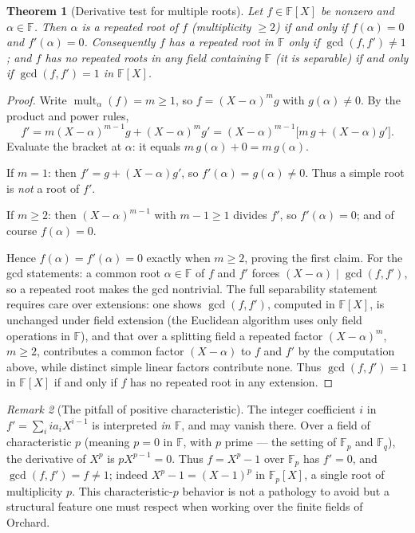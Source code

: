 \documentclass[11pt,a4paper]{article}
\newtheorem{theorem}{Theorem}[section]
\theoremstyle{definition}
\theoremstyle{remark}
\newtheorem{remark}[theorem]{Remark}
\newcommand{\F}{\ensuremath{\mathbb{F}}}
\newcommand{\Fp}{\ensuremath{\mathbb{F}_{p}}}
\newcommand{\Fq}{\ensuremath{\mathbb{F}_{q}}}
\begin{document}
\begin{theorem}[Derivative test for multiple roots]\label{polynomials:thm:multiple-root}
Let \(f \in \F[X]\) be nonzero and \(\alpha \in \F\). Then \(\alpha\) is a
repeated root of \(f\) (multiplicity \(\ge 2\)) if and only if
\(f(\alpha) = 0\) and \(f'(\alpha) = 0\). Consequently \(f\) has a repeated root
in \(\F\) only if \(\gcd(f, f') \neq 1\); and \(f\) has no repeated roots in any
field containing \(\F\) (it is \emph{separable}) if and only if
\(\gcd(f, f') = 1\) in \(\F[X]\).
\end{theorem}

\begin{proof}
Write \(\operatorname{mult}_\alpha(f) = m \ge 1\), so \(f = (X - \alpha)^m g\)
with \(g(\alpha) \neq 0\). By the product and power rules,
\[
  f' = m (X - \alpha)^{m-1} g + (X - \alpha)^m g'
     = (X - \alpha)^{m-1}\bigl[m\, g + (X - \alpha) g'\bigr].
\]
Evaluate the bracket at \(\alpha\): it equals \(m\, g(\alpha) + 0 = m\, g(\alpha)\).

If \(m = 1\): then \(f' = g + (X-\alpha)g'\), so \(f'(\alpha) = g(\alpha) \neq 0\).
Thus a simple root is \emph{not} a root of \(f'\).

If \(m \ge 2\): then \((X-\alpha)^{m-1}\) with \(m - 1 \ge 1\) divides \(f'\),
so \(f'(\alpha) = 0\); and of course \(f(\alpha) = 0\).

Hence \(f(\alpha) = f'(\alpha) = 0\) exactly when \(m \ge 2\), proving the first
claim. For the gcd statements: a common root \(\alpha \in \F\) of \(f\) and
\(f'\) forces \((X - \alpha) \mid \gcd(f, f')\), so a repeated root makes the gcd
nontrivial. The full separability statement requires care over extensions: one
shows \(\gcd(f, f')\), computed in \(\F[X]\), is unchanged under field extension
(the Euclidean algorithm uses only field operations in \(\F\)), and that over a
splitting field a repeated factor \((X-\alpha)^m\), \(m\ge 2\), contributes a
common factor \((X-\alpha)\) to \(f\) and \(f'\) by the computation above, while
distinct simple linear factors contribute none. Thus \(\gcd(f, f') = 1\) in
\(\F[X]\) if and only if \(f\) has no repeated root in any extension.
\end{proof}

\begin{remark}[The pitfall of positive characteristic]\label{polynomials:rem:char-p}
The integer coefficient \(i\) in \(f' = \sum_i i a_i X^{i-1}\) is interpreted
\emph{in \(\F\)}, and may vanish there. Over a field of characteristic \(p\)
(meaning \(p = 0\) in \(\F\), with \(p\) prime — the setting of \(\Fp\) and
\(\Fq\)), the derivative of \(X^p\) is \(p X^{p-1} = 0\). Thus \(f = X^p - 1\) over
\(\Fp\) has \(f' = 0\), and \(\gcd(f, f') = f \neq 1\); indeed
\(X^p - 1 = (X - 1)^p\) in \(\Fp[X]\), a single root of multiplicity \(p\). This
characteristic-\(p\) behavior is not a pathology to avoid but a structural
feature one must respect when working over the finite fields of Orchard.
\end{remark}
\end{document}
